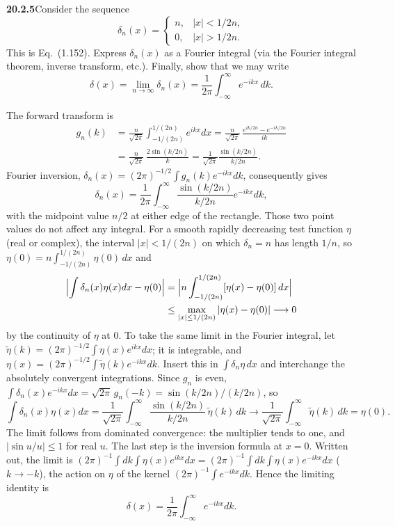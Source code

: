 \par\bigskip
\noindent\textbf{20.2.5}\quad Consider the sequence
\[
\delta_{n}(x)=\begin{cases}
n, & |x| < 1/2n,\\
0, & |x| > 1/2n.
\end{cases}
\]
This is Eq.~(1.152). Express $\delta_{n}(x)$ as a Fourier integral
(via the Fourier integral theorem, inverse transform, etc.).
Finally, show that we may write
\[
\delta(x)=\lim_{n\to\infty}\delta_{n}(x)
=\frac{1}{2\pi}\int_{-\infty}^{\infty}e^{-ikx}\,dk.
\]
\par{}
\solution
The forward transform is
\begin{align*}
g_n(k)&=\frac n{\sqrt{2\pi}}\int_{-1/(2n)}^{1/(2n)}e^{ikx}dx
=\frac n{\sqrt{2\pi}}\,\frac{e^{ik/2n}-e^{-ik/2n}}{ik}\\
&=\frac n{\sqrt{2\pi}}\,\frac{2\sin(k/2n)}{k}
=\frac1{\sqrt{2\pi}}\frac{\sin(k/2n)}{k/2n}.
\end{align*}
Fourier inversion,
$\delta_n(x)=(2\pi)^{-1/2}\int g_n(k)e^{-ikx}dk$, consequently gives
\[
\boxed{\delta_n(x)=\frac1{2\pi}\int_{-\infty}^{\infty}
\frac{\sin(k/2n)}{k/2n}e^{-ikx}dk},
\]
with the midpoint value $n/2$ at either edge of the rectangle.
Those two point values do not affect any integral.
For a smooth rapidly decreasing test function $\eta$ (real or
complex), the interval $|x|<1/(2n)$ on which $\delta_n=n$ has
length $1/n$, so $\eta(0)=n\int_{-1/(2n)}^{1/(2n)}\eta(0)\,dx$ and
\begin{align*}
\Bigl|\int\delta_n(x)\eta(x)dx-\eta(0)\Bigr|
&=\Bigl|n\int_{-1/(2n)}^{1/(2n)}[\eta(x)-\eta(0)]\,dx\Bigr|\\
&\le\max_{|x|\le1/(2n)}|\eta(x)-\eta(0)|\longrightarrow0
\end{align*}
by the continuity of $\eta$ at $0$.
To take the same limit in the Fourier integral, let
$\tilde\eta(k)=(2\pi)^{-1/2}\int\eta(x)e^{ikx}dx$; it is
integrable, and $\eta(x)=(2\pi)^{-1/2}\int\tilde\eta(k)e^{-ikx}dk$.
Insert this in $\int\delta_n\eta\,dx$ and interchange the
absolutely convergent integrations. Since $g_n$ is even,
$\int\delta_n(x)e^{-ikx}dx=\sqrt{2\pi}\,g_n(-k)
=\sin(k/2n)/(k/2n)$, so
\[
\int\delta_n(x)\eta(x)dx
=\frac1{\sqrt{2\pi}}\int_{-\infty}^{\infty}
\frac{\sin(k/2n)}{k/2n}\,\tilde\eta(k)\,dk
\longrightarrow\frac1{\sqrt{2\pi}}\int_{-\infty}^{\infty}
\tilde\eta(k)\,dk=\eta(0).
\]
The limit follows from dominated convergence: the multiplier
tends to one, and $|\sin u/u|\le1$ for real $u$. The last step
is the inversion formula at $x=0$. Written out, the limit is
$(2\pi)^{-1}\int dk\int\eta(x)e^{ikx}dx
=(2\pi)^{-1}\int dk\int\eta(x)e^{-ikx}dx$ ($k\to-k$),
the action on $\eta$ of the kernel $(2\pi)^{-1}\int e^{-ikx}dk$.
Hence the limiting identity is
\[
\boxed{\delta(x)=\frac1{2\pi}\int_{-\infty}^{\infty}e^{-ikx}dk}.
\]

